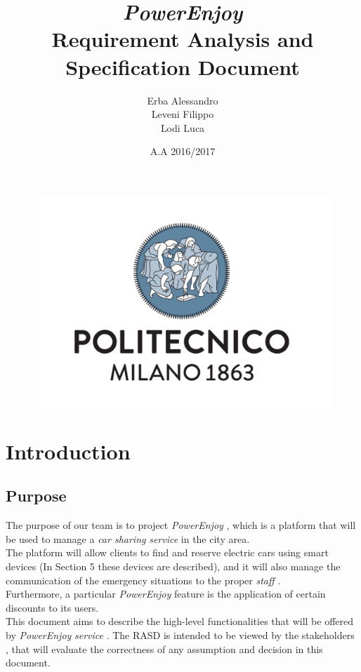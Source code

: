 \documentclass[english]{article}
\newcommand{\carsharing}{\textit {car sharing }}
\newcommand{\powerenjoy}{\textit{PowerEnjoy }}
\newcommand{\staff}{\textit{staff }}
\newcommand{\service}{\textit{service }}
\begin{document}
\begin{figure}
	\centering
	\includegraphics[scale=0.5]{logo.pdf} 
\end{figure}


\title{\powerenjoy\\
 Requirement Analysis and Specification Document\\
}

\date{A.A 2016/2017}

\author{Erba Alessandro\\
 Leveni Filippo\\
 Lodi Luca}

\maketitle
\pagebreak{}

\tableofcontents{} \pagebreak{}

\section{Introduction}
	\subsection{Purpose}
	
		The purpose of our team is to project \powerenjoy, which is  a platform that will be used to manage a \carsharing \service  in the city area.\\
 		The platform will allow clients to find and reserve electric cars using smart devices (In Section 5 these devices are described), and it will also manage the communication of the emergency situations to the proper \staff.\\
  		Furthermore, a particular \powerenjoy feature is the application of certain discounts to its users.\\
 		 \tab \tab This document aims to describe the high-level functionalities that will be offered by \powerenjoy \service. The RASD is intended to be viewed by the stakeholders , that will evaluate the correctness of any assumption and decision in this document.
  
\end{document}

